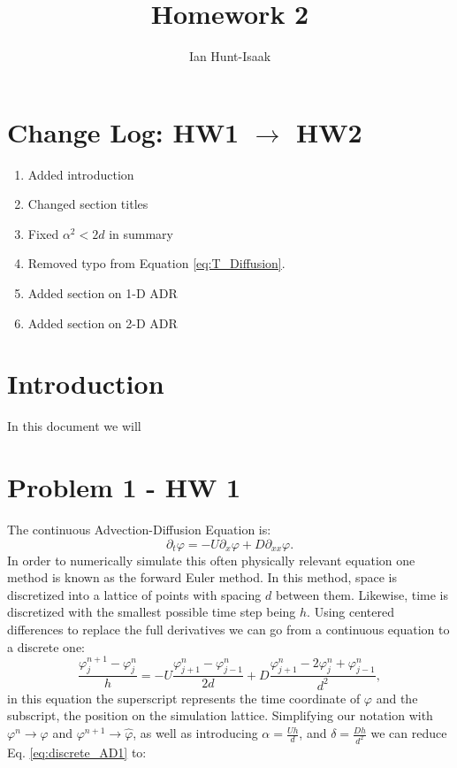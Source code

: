 \documentclass[]{article}
\title{Homework 2}
\author{Ian Hunt-Isaak}
\date{}
\begin{document}
\maketitle

\section{Change Log: HW1 $\to$ HW2}
\begin{enumerate}
	\item Added introduction
	\item Changed section titles
	\item Fixed $\alpha^2 < 2d$ in summary
	\item Removed typo from Equation \ref{eq:T_Diffusion}.
	\item Added section on 1-D ADR
	\item Added section on 2-D ADR
\end{enumerate}
\section{Introduction}
In this document we will 
\section{Problem 1 - HW 1}
The continuous Advection-Diffusion Equation is:
\begin{equation}
\partial_t \varphi = -U \partial_x \varphi + D \partial_{xx}\varphi.
\label{eq:AD_cont}
\end{equation}
In order to numerically simulate this often physically relevant equation one method is known as the forward Euler method. In this method, space is discretized into a lattice of points with spacing $d$ between them. Likewise, time is discretized with the smallest possible time step being $h$. Using centered differences to replace the full derivatives we can go from a continuous equation to a discrete one:
\begin{equation}
\frac{\varphi^{n+1}_j-\varphi^n_j}{h} = -U \frac{\varphi^n_{j+1}-\varphi^n_{j-1}}{2d} + D \frac{\varphi^n_{j+1}-2\varphi^n_{j}+\varphi^n_{j-1}}{d^2},
\label{eq:discrete_AD1}
\end{equation}
in this equation the superscript represents the time coordinate of $\varphi$ and the subscript, the position on the simulation lattice. Simplifying our notation with $\varphi^n \to \varphi$ and $\varphi^{n+1} \to \hat{\varphi}$, as well as introducing $\alpha = \frac{Uh}{d}$, and $\delta=\frac{Dh}{d^2}$  we can reduce Eq. \ref{eq:discrete_AD1} to:
\end{document}
